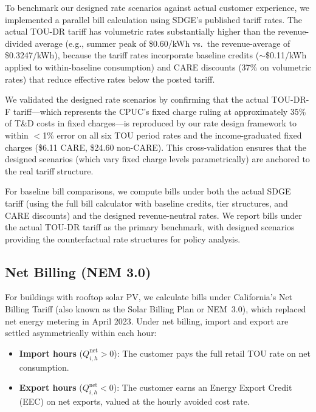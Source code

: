 \documentclass[12pt]{article}
\begin{document}
To benchmark our designed rate scenarios against actual customer experience, we implemented a parallel bill calculation using SDGE's published tariff rates. The actual TOU-DR tariff has volumetric rates substantially higher than the revenue-divided average (e.g., summer peak of \$0.60/kWh vs.\ the revenue-average of \$0.3247/kWh), because the tariff rates incorporate baseline credits ($\sim$\$0.11/kWh applied to within-baseline consumption) and CARE discounts (37\% on volumetric rates) that reduce effective rates below the posted tariff.

We validated the designed rate scenarios by confirming that the actual TOU-DR-F tariff---which represents the CPUC's fixed charge ruling at approximately 35\% of T\&D costs in fixed charges---is reproduced by our rate design framework to within $<$1\% error on all six TOU period rates and the income-graduated fixed charges (\$6.11 CARE, \$24.60 non-CARE). This cross-validation ensures that the designed scenarios (which vary fixed charge levels parametrically) are anchored to the real tariff structure.

For baseline bill comparisons, we compute bills under both the actual SDGE tariff (using the full bill calculator with baseline credits, tier structures, and CARE discounts) and the designed revenue-neutral rates. We report bills under the actual TOU-DR tariff as the primary benchmark, with designed scenarios providing the counterfactual rate structures for policy analysis.

\subsection{Net Billing (NEM 3.0)}
\label{sec:net_billing}

For buildings with rooftop solar PV, we calculate bills under California's Net Billing Tariff (also known as the Solar Billing Plan or NEM~3.0), which replaced net energy metering in April 2023. Under net billing, import and export are settled asymmetrically within each hour:
\begin{itemize}
    \item \textbf{Import hours} ($Q_{i,h}^{\text{net}} > 0$): The customer pays the full retail TOU rate on net consumption.
    \item \textbf{Export hours} ($Q_{i,h}^{\text{net}} < 0$): The customer earns an Energy Export Credit (EEC) on net exports, valued at the hourly avoided cost rate.
\end{itemize}
\end{document}
